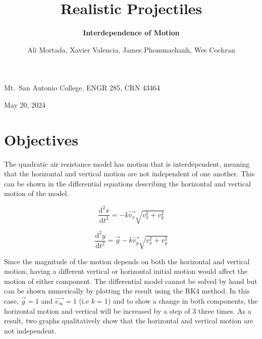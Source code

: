 \documentclass[12pt]{iopart} %
\begin{document}
\title{Realistic Projectiles}
\author{Ali Mortada, Xavier Valencia, James Phommachanh, Wes Cochran}
\vspace{10pt}
\begin{indented}
  \item[]Mt.~San Antonio College, ENGR 285, CRN 43464
  \item[]May 20, 2024
\end{indented}
\newpage

\section{Objectives}

\begin{center}
\subtitle{\textbf{Interdependence of Motion}}
\end{center}

The quadratic air resistance model has motion that is interdependent, meaning that the horizontal and vertical motion are not independent of one another. 
This can be shown in the differential equations describing the horizontal and vertical motion of the model. 

\begin{equation} \label{eq:1}
    \frac{\mathrm{d}^2 x}{\mathrm{d}t^2} = -k \vec{v_x} \sqrt{v_x^2+v_y^2}
\end{equation}

\begin{equation} \label{eq:2}
  \frac{\mathrm{d}^2 y}{\mathrm{d}t^2} = \vec{g} -k \vec{v_y} \sqrt{v_x^2+v_y^2}
\end{equation}


Since the magnitude of the motion depends on both the horizontal and vertical motion, having a different vertical or horizontal initial motion would affect the motion of either component. 
The differential model cannot be solved by hand but can be shown numerically by plotting the result using the RK4 method. 
In this case, $\vec{g} = 1$ and $\vec{v_\infty} = 1$ (i.e $k = 1$) and to show a change in both components, the horizontal motion and vertical will be increased by a step of 3 three times. 
As a result, two graphs qualitatively show that the horizontal and vertical motion are not independent. 

\end{document}
